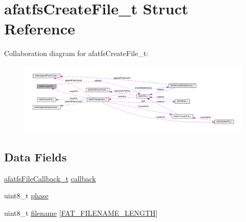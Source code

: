 \hypertarget{structafatfsCreateFile__t}{\section{afatfs\+Create\+File\+\_\+t Struct Reference}
\label{structafatfsCreateFile__t}
}


Collaboration diagram for afatfs\+Create\+File\+\_\+t\+:\nopagebreak
\begin{figure}[H]
\begin{center}
\leavevmode
\includegraphics[width=350pt]{structafatfsCreateFile__t__coll__graph}
\end{center}
\end{figure}
\subsection*{Data Fields}
\begin{DoxyCompactItemize}
\item 
\hyperlink{asyncfatfs_8h_aaa910b9db73f482a20cfa5a7f3970e7f}{afatfs\+File\+Callback\+\_\+t} \hyperlink{structafatfsCreateFile__t_a3873f06044c56d0bbc1156d2a4c2ab88}{callback}
\item 
uint8\+\_\+t \hyperlink{structafatfsCreateFile__t_a7909c269ae51e220a400949c7256fcc3}{phase}
\item 
uint8\+\_\+t \hyperlink{structafatfsCreateFile__t_afdc6a31b8bd2de176205ad456861fd07}{filename} \mbox{[}\hyperlink{fat__standard_8h_a9ff437da130628a5afeeefe5186522a9}{F\+A\+T\+\_\+\+F\+I\+L\+E\+N\+A\+M\+E\+\_\+\+L\+E\+N\+G\+T\+H}\mbox{]}
\end{DoxyCompactItemize}


